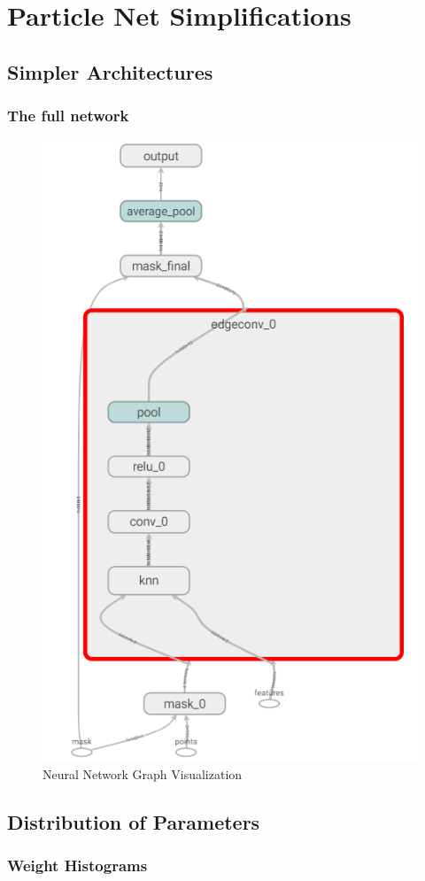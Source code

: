 \chapter{Particle Net Simplifications}


\section{Simpler Architectures}

\subsection{The full network}

\begin{figure}[H]
    \centering
    \includegraphics[width=0.4\linewidth]{img/simplify-particle-net/network.png}
    \caption{Neural Network Graph Visualization}
\end{figure}



\section{Distribution of Parameters}

\subsection{Weight Histograms}

